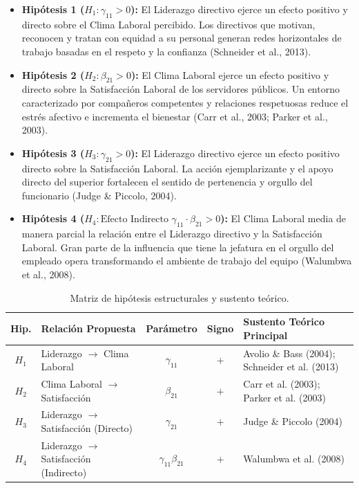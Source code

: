 \documentclass[11pt, a4paper]{article} %
\begin{document}
\begin{itemize}[leftmargin=*, itemsep=2pt]
    \item \textbf{Hipótesis 1 ($H_1: \gamma_{11} > 0$):} El Liderazgo directivo ejerce un efecto positivo y directo sobre el Clima Laboral percibido. Los directivos que motivan, reconocen y tratan con equidad a su personal generan redes horizontales de trabajo basadas en el respeto y la confianza (Schneider et al., 2013).
    \item \textbf{Hipótesis 2 ($H_2: \beta_{21} > 0$):} El Clima Laboral ejerce un efecto positivo y directo sobre la Satisfacción Laboral de los servidores públicos. Un entorno caracterizado por compañeros competentes y relaciones respetuosas reduce el estrés afectivo e incrementa el bienestar (Carr et al., 2003; Parker et al., 2003).
    \item \textbf{Hipótesis 3 ($H_3: \gamma_{21} > 0$):} El Liderazgo directivo ejerce un efecto positivo directo sobre la Satisfacción Laboral. La acción ejemplarizante y el apoyo directo del superior fortalecen el sentido de pertenencia y orgullo del funcionario (Judge \& Piccolo, 2004).
    \item \textbf{Hipótesis 4 ($H_4: \text{Efecto Indirecto } \gamma_{11} \cdot \beta_{21} > 0$):} El Clima Laboral media de manera parcial la relación entre el Liderazgo directivo y la Satisfacción Laboral. Gran parte de la influencia que tiene la jefatura en el orgullo del empleado opera transformando el ambiente de trabajo del equipo (Walumbwa et al., 2008).
\end{itemize}

\begin{table}[H]
\centering
\caption{Matriz de hipótesis estructurales y sustento teórico.}
\label{tab:hipotesis_resumen}
\footnotesize 
\begin{tabularx}{\textwidth}{c X c c X}
\toprule
\textbf{Hip.} & \textbf{Relación Propuesta} & \textbf{Parámetro} & \textbf{Signo} & \textbf{Sustento Teórico Principal} \\
\midrule
$H_1$ & Liderazgo $\rightarrow$ Clima Laboral & $\gamma_{11}$ & $+$ & Avolio \& Bass (2004); Schneider et al. (2013) \\
$H_2$ & Clima Laboral $\rightarrow$ Satisfacción & $\beta_{21}$ & $+$ & Carr et al. (2003); Parker et al. (2003) \\
$H_3$ & Liderazgo $\rightarrow$ Satisfacción (Directo) & $\gamma_{21}$ & $+$ & Judge \& Piccolo (2004) \\
$H_4$ & Liderazgo $\rightarrow$ Satisfacción (Indirecto) & $\gamma_{11}\beta_{21}$ & $+$ & Walumbwa et al. (2008) \\
\bottomrule
\end{tabularx}
\end{table}
\end{document}
